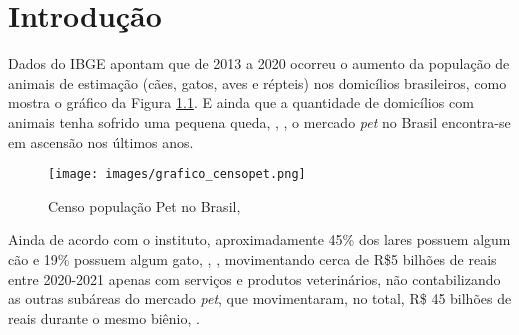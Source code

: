 \documentclass[
    12pt,               %
    openright,          %
    oneside,
    a4paper,            %
    BIBLATEX,           %
    TODO,               %
    english,            %
    brazil              %
    ]{ifsp-spo-inf-ctds}
\begin{document}
\listoffigures*
\cleardoublepage

\listoftables*
\cleardoublepage

\listofquadros*
\cleardoublepage





%




%
\tableofcontents*
\textual
\chapter[Introdução]{Introdução} \label{intro}
    Dados do IBGE apontam que de 2013 a 2020 ocorreu o aumento da população de animais de estimação (cães, gatos, aves e répteis) nos domicílios brasileiros, como mostra o gráfico da Figura \ref{fig:grafico_pet}. E ainda que a quantidade de domicílios com animais tenha sofrido uma pequena queda, , , o mercado \emph{pet} no Brasil encontra-se em ascensão nos últimos anos.


    \begin{figure}[H]
        \centering
        \texttt{[image: images/grafico\_censopet.png]}
        \caption{Censo população Pet no Brasil, }
        \label{fig:grafico_pet}
    \end{figure}
    
    Ainda de acordo com o instituto, aproximadamente 45\% dos lares possuem algum cão e 19\% possuem algum gato, , , movimentando cerca de R\$5 bilhões de reais entre 2020-2021 apenas com serviços e produtos veterinários, não contabilizando as outras subáreas do mercado \emph{pet}, que movimentaram, no total, R\$ 45 bilhões de reais durante o mesmo biênio, .
\end{document}
